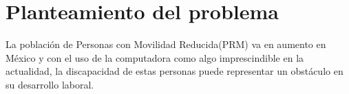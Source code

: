 \section{Planteamiento del problema}
La poblaci\'on de Personas con Movilidad Reducida(PRM) va en aumento en M\'exico 
 y con el uso de la computadora como algo imprescindible en la actualidad, la
 discapacidad de estas personas puede representar un obst\'aculo en su 
 desarrollo laboral.